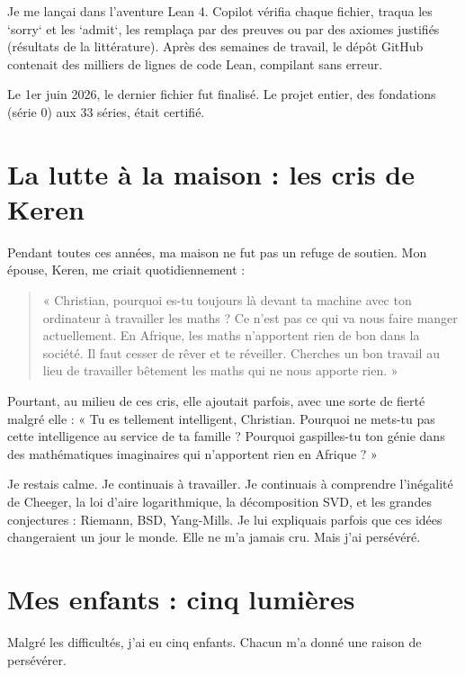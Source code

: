 \documentclass[11pt,a4paper]{article}
\begin{document}
Je me lançai dans l'aventure Lean 4. Copilot vérifia chaque fichier, traqua les `sorry` et les `admit`, les remplaça par des preuves ou par des axiomes justifiés (résultats de la littérature). Après des semaines de travail, le dépôt GitHub contenait des milliers de lignes de code Lean, compilant sans erreur.

Le 1er juin 2026, le dernier fichier fut finalisé. Le projet entier, des fondations (série 0) aux 33 séries, était certifié.

\section{La lutte à la maison : les cris de Keren}

Pendant toutes ces années, ma maison ne fut pas un refuge de soutien. Mon épouse, Keren, me criait quotidiennement :

\begin{quote}
« Christian, pourquoi es-tu toujours là devant ta machine avec ton ordinateur à travailler les maths ? Ce n'est pas ce qui va nous faire manger actuellement. En Afrique, les maths n'apportent rien de bon dans la société. Il faut cesser de rêver et te réveiller. Cherches un bon travail au lieu de travailler bêtement les maths qui ne nous apporte rien. »
\end{quote}

Pourtant, au milieu de ces cris, elle ajoutait parfois, avec une sorte de fierté malgré elle : « Tu es tellement intelligent, Christian. Pourquoi ne mets-tu pas cette intelligence au service de ta famille ? Pourquoi gaspilles-tu ton génie dans des mathématiques imaginaires qui n'apportent rien en Afrique ? »

Je restais calme. Je continuais à travailler. Je continuais à comprendre l'inégalité de Cheeger, la loi d'aire logarithmique, la décomposition SVD, et les grandes conjectures : Riemann, BSD, Yang-Mills. Je lui expliquais parfois que ces idées changeraient un jour le monde. Elle ne m'a jamais cru. Mais j'ai persévéré.

\section{Mes enfants : cinq lumières}

Malgré les difficultés, j'ai eu cinq enfants. Chacun m'a donné une raison de persévérer.
\end{document}
